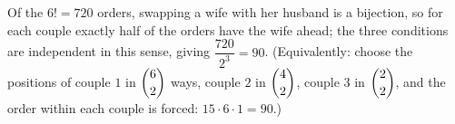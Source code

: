 Of the $6!=720$ orders, swapping a wife with her husband is a bijection, so for each couple exactly half of the orders have the wife ahead; the three conditions are independent in this sense, giving $\dfrac{720}{2^3}=\boxed{90}$. (Equivalently: choose the positions of couple $1$ in $\dbinom62$ ways, couple $2$ in $\dbinom42$, couple $3$ in $\dbinom22$, and the order within each couple is forced: $15\cdot6\cdot1=90$.)
